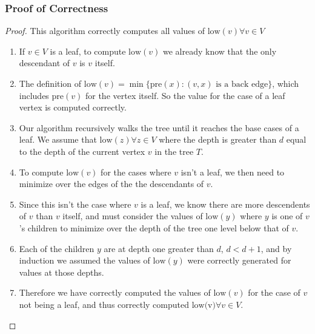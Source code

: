 \documentclass{article}
\begin{document}
\subsubsection{Proof of Correctness}
\begin{proof} This algorithm correctly computes all values of \(\text{low}(v) \forall v
      \in V\)
      \begin{enumerate}
            \item If \(v \in V\) is a leaf, to compute \(\text{low}(v)\) we already know
                  that the only descendant of \(v\) is \(v\) itself.
            \item The definition of \(\text{low}(v) = \min{ \{ \text{pre}(x) : (v,x)
                        \text{ is a back edge}\} } \), which includes \(\text{pre}(v)\) for the vertex
                  itself. So the value for the case of a leaf vertex is computed correctly.
            \item Our algorithm recursively walks the tree until it reaches the base cases
                  of a leaf. We assume that \(\text{low}(z) \forall z \in V\) where the depth is
                  greater than \(d\) equal to the depth of the current vertex \(v\) in the tree
                  \(T\).
            \item To compute \(\text{low}(v)\) for the cases where \(v\) isn't a leaf, we
                  then need to minimize over the edges of the the descendants of \(v\).
            \item Since this isn't the case where \(v\) is a leaf, we know there are more
                  descendents of \(v\) than \(v\) itself, and must consider the values of
                  \(\text{low}(y)\) where \(y\) is one of \(v\)'s children to minimize over the
                  depth of the tree one level below that of \(v\).
            \item Each of the children \(y\) are at depth one greater than \(d\), \(d < d
                  + 1\), and by induction we assumed the values of \(\text{low}(y)\) were
                  correctly generated for values at those depths.
            \item Therefore we have correctly computed the values of \(\text{low}(v)\) for the
                  case of \(v\) not being a leaf, and thus correctly computed \(\text{low(v)}
                  \forall v \in V\).
      \end{enumerate}
\end{proof}
\end{document}
